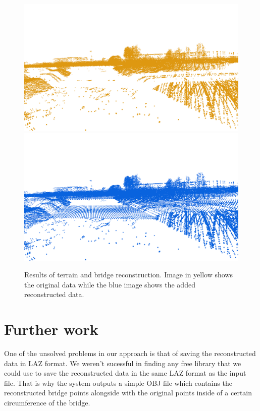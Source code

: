 \documentclass{egpubl-eurovis-star}
\begin{document}
\begin{figure}[ht]
    \centering
    \includegraphics[width=1\columnwidth]{front_pre.png}
    \includegraphics[width=1\columnwidth]{front_br.png}
    \caption{Results of terrain and bridge reconstruction. Image in yellow shows the original data while the blue image shows the added reconstructed data.}
    \label{fig4}
\end{figure}


\section{Further work}

One of the unsolved problems in our approach is that of saving the reconstructed data in LAZ format.
We weren't sucessful in finding any free library that we could use to save the reconstructed data in the same LAZ format as the input file.
That is why the system outputs a simple OBJ file which contains the reconstructed bridge points alongside with the original points inside of a certain circumference of the bridge.
\end{document}
